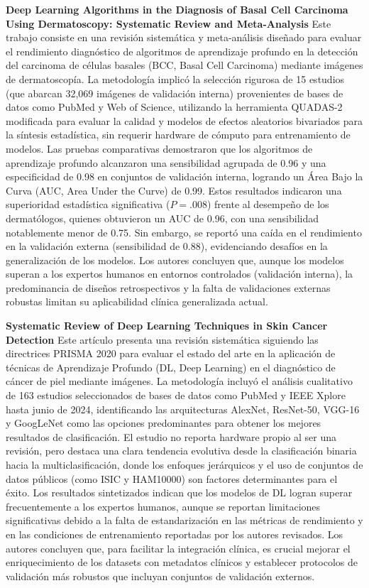 \documentclass[11pt, a4paper]{article}
\begin{document}
\textbf{Deep Learning Algorithms in the Diagnosis of Basal Cell Carcinoma Using Dermatoscopy: Systematic Review and Meta-Analysis} \cite{liu_deep_2025}
Este trabajo consiste en una revisión sistemática y meta-análisis diseñado para evaluar el rendimiento diagnóstico de algoritmos de aprendizaje profundo en la detección del carcinoma de células basales (BCC, Basal Cell Carcinoma) mediante
imágenes de dermatoscopía. La metodología implicó la selección rigurosa de 15 estudios (que abarcan 32,069 imágenes de validación interna) provenientes de bases de datos como PubMed y Web of Science, utilizando la herramienta QUADAS-2
modificada para evaluar la calidad y modelos de efectos aleatorios bivariados para la síntesis estadística, sin requerir hardware de cómputo para entrenamiento de modelos. Las pruebas comparativas demostraron que los algoritmos de aprendizaje
profundo alcanzaron una sensibilidad agrupada de 0.96 y una especificidad de 0.98 en conjuntos de validación interna, logrando un Área Bajo la Curva (AUC, Area Under the Curve) de 0.99. Estos resultados indicaron una superioridad estadística
significativa ($P=.008$) frente al desempeño de los dermatólogos, quienes obtuvieron un AUC de 0.96, con una sensibilidad notablemente menor de 0.75. Sin embargo, se reportó una caída en el rendimiento en la validación externa (sensibilidad
de 0.88), evidenciando desafíos en la generalización de los modelos. Los autores concluyen que, aunque los modelos superan a los expertos humanos en entornos controlados (validación interna), la predominancia de diseños retrospectivos y la falta
de validaciones externas robustas limitan su aplicabilidad clínica generalizada actual.

\textbf{Systematic Review of Deep Learning Techniques in Skin Cancer Detection} \cite{magalhaes_systematic_2024}
Este artículo presenta una revisión sistemática siguiendo las directrices PRISMA 2020 para evaluar el estado del arte en la aplicación de técnicas de Aprendizaje Profundo (DL, Deep Learning) en el diagnóstico de cáncer de piel mediante imágenes.
La metodología incluyó el análisis cualitativo de 163 estudios seleccionados de bases de datos como PubMed y IEEE Xplore hasta junio de 2024, identificando las arquitecturas AlexNet, ResNet-50, VGG-16 y GoogLeNet como las opciones predominantes
para obtener los mejores resultados de clasificación. El estudio no reporta hardware propio al ser una revisión, pero destaca una clara tendencia evolutiva desde la clasificación binaria hacia la multiclasificación, donde los enfoques jerárquicos
y el uso de conjuntos de datos públicos (como ISIC y HAM10000) son factores determinantes para el éxito. Los resultados sintetizados indican que los modelos de DL logran superar frecuentemente a los expertos humanos, aunque se reportan limitaciones
significativas debido a la falta de estandarización en las métricas de rendimiento y en las condiciones de entrenamiento reportadas por los autores revisados. Los autores concluyen que, para facilitar la integración clínica, es crucial mejorar
el enriquecimiento de los datasets con metadatos clínicos y establecer protocolos de validación más robustos que incluyan conjuntos de validación externos.
\end{document}
